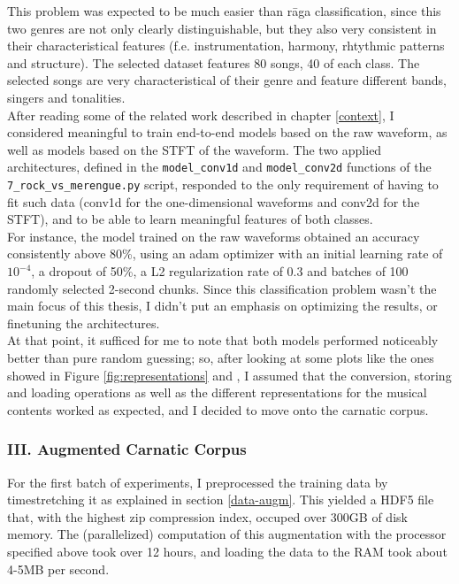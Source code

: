 This problem was expected to be much easier than r\=aga classification, since this two genres are not only clearly distinguishable, but they also very consistent in their characteristical features (f.e. instrumentation, harmony, rhtythmic patterns and structure). The selected dataset features 80 songs, 40 of each class. The selected songs are very characteristical of their genre and feature different bands, singers and tonalities.\\

After reading some of the related work described in chapter \ref{context}, I considered meaningful to train end-to-end models based on the raw waveform, as well as models based on the STFT of the waveform. The two applied architectures, defined in the  \texttt{model\_conv1d} and \texttt{model\_conv2d} functions of the \texttt{7\_rock\_vs\_merengue.py} script, responded to the only requirement of having to fit such data (conv1d for the one-dimensional waveforms and conv2d for the STFT), and to be able to learn meaningful features of both classes.\\

For instance, the model trained on the raw waveforms obtained an accuracy consistently above 80\%, using an adam optimizer with an initial learning rate of \(10^{-4}\), a dropout of 50\%, a L2 regularization rate of 0.3 and batches of 100 randomly selected 2-second chunks. Since this classification problem wasn't the main focus of this thesis, I didn't put an emphasis on optimizing the results, or finetuning the architectures.\\

At that point, it sufficed for me to note that both models performed noticeably better than pure random guessing; so, after looking at some plots like the ones showed in Figure \ref{fig:representations} and \label{fig:rock_wt}, I assumed that the conversion, storing and loading operations as well as the different representations for the musical contents worked as expected, and I decided to move onto the carnatic corpus.


\subsubsection{III. Augmented Carnatic Corpus}

For the first batch of experiments, I preprocessed the training data by timestretching it as explained in section \ref{data-augm}. This yielded a HDF5 file that, with the highest zip compression index, occuped over 300GB of disk memory. The (parallelized) computation of this augmentation with the processor specified above took over 12 hours, and loading the data to the RAM took about 4-5MB per second.\\

